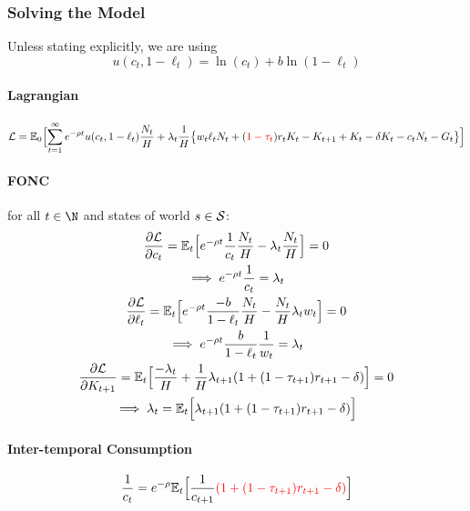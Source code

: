 \documentclass[11pt]{article}
\newcommand{\expat}[2]{\mathbb{E}_{#1}\Big[{#2}\Big]}
\begin{document}
		\subsubsection{Solving the Model}
			\begin{assumption}
				Unless stating explicitly, we are using
				\begin{equation}
					u(c_t, 1-\ell_t) = \ln(c_t) + b \ln(1-\ell_t)
				\end{equation}
			\end{assumption}
			
			\paragraph{Lagrangian}
				\begin{equation}
					\mc{L} = \expat{0}{ \sum_{t=1}^\infty e^{-\rho t} u(c_t, 1 - \ell_t) \frac{N_t}{H} + \lambda_t \frac{1}{H}
						\big \{ w_t \ell_t N_t + (\textcolor{red}{1-\tau_t})r_t K_t - K_{t+1} + K_t - \delta K_t - c_t N_t - G_t \big \} }
				\end{equation}
			\paragraph{FONC} for all $t \in \N$ and states of world $s \in \mathcal{{S}}$:
				\begin{gather}
					\pd{\mc{L}}{c_t} = \expat{t}{
						e^{-\rho t} \frac{1}{c_t} \frac{N_t}{H} - \lambda_t \frac{N_t}{H}
					} = 0 \\
					\implies e^{-\rho t} \frac{1}{c_t} = \lambda_t \\
					\pd{\mc{L}}{\ell_t} = \expat{t}{
						e^{-\rho t} \frac{-b}{1 - \ell_t}\frac{N_t}{H} - \frac{N_t}{H} \lambda_t w_t
					} = 0 \\
					\implies e^{-\rho t} \frac{b}{1 - \ell_t} \frac{1}{w_t} = \lambda_t \\
					\pd{\mc{L}}{K_{t+1}} = \expat{t}{
						\frac{-\lambda_t}{H} + \frac{1}{H} \lambda_{t+1} (1 + (1-\tau_{t+1})r_{t+1} - \delta)
					} = 0 \\
					\implies \lambda_t = \expat{t}{\lambda_{t+1}(1 + (1-\tau_{t+1})r_{t+1} - \delta)}
				\end{gather}
			
			\paragraph{Inter-temporal Consumption}
				\begin{equation}
					\frac{1}{c_t} = e^{-\rho} \expat{t}{
						\frac{1}{c_{t+1}} \textcolor{red}{(1 + (1-\tau_{t+1})r_{t+1} - \delta)}
					}
				\end{equation}
			
\end{document}
